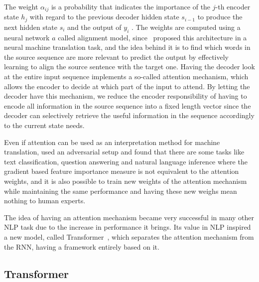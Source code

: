 The weight $\alpha_{i j}$ is a probability that indicates the importance of the $j$-th encoder state $h_j$ with regard to the previous decoder hidden state $s_{i-1}$ to produce the next hidden state $s_i$ and the output of $y_i$ . The weights are computed using a neural network $a$ called alignment model, since~\cite{bahdanau2014neural} proposed this architecture in a neural machine translation task, and the idea behind it is to find which words in the source sequence are more relevant to predict the output by effectively learning to align the source sentence with the target one. Having the decoder look at the entire input sequence implements a so-called attention mechanism, which allows the encoder to decide at which part of the input to attend.  By letting the decoder have this mechanism, we reduce the encoder responsibility of having to encode all information in the source sequence into a fixed length vector since the decoder can selectively retrieve the useful information in the sequence accordingly to the current state needs.

Even if attention can be used as an interpretation method for machine translation, \citet{sarthak2019attention} used an adversarial setup and found that there are some tasks like text classification, question answering and natural language inference where the gradient based feature importance measure is not equivalent to the attention weights, and it is also possible to train new weights of the attention mechanism while maintaining the same performance and having these new weighs mean nothing to human experts.

The idea of having an attention mechanism became very successful in many other NLP task due to the increase in performance it brings. Its value in NLP inspired a new model, called Transformer~\citep{vaswani2017attention}, which separates the attention mechanism from the RNN, having a framework entirely based on it. 

\subsection{Transformer}

